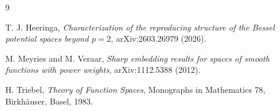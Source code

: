 \documentclass[11pt]{article}
\begin{document}
\begin{thebibliography}{9}

T. J. Heeringa,
\emph{Characterization of the reproducing structure of the Bessel potential
spaces beyond $p=2$},
arXiv:2603.26979 (2026).

M. Meyries and M. Veraar,
\emph{Sharp embedding results for spaces of smooth functions with power
weights},
arXiv:1112.5388 (2012).

H. Triebel,
\emph{Theory of Function Spaces},
Monographs in Mathematics 78, Birkh\"auser, Basel, 1983.

\end{thebibliography}
\end{document}

